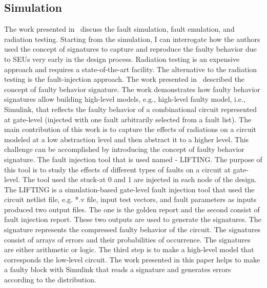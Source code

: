 \subsection{Simulation}

The work presented in~\cite{robache2013methodology} discuss the fault simulation, fault emulation, and radiation testing. Starting from the simulation, I can interrogate how the authors used the concept of signatures to capture and reproduce the faulty behavior due to SEUs very early in the design process.
Radiation testing is an expensive approach and requires a state-of-the-art facility. The alternative to the radiation testing is the fault-injection approach.  The work presented in~\cite{hobeika2014multi} described the concept of faulty behavior signature. The work demonstrates how faulty behavior signatures allow building high-level models, e.g., high-level faulty model, i.e., Simulink, that reflects the faulty behavior of a combinational circuit represented at gate-level  (injected with one fault arbitrarily selected from a fault list). The main contribution of this work is to capture the effects of radiations on a circuit modeled at a low abstraction level and then abstract it to a  higher level. This challenge can be accomplished by introducing the concept of faulty behavior signature.  The fault injection tool that is used named - LIFTING.  The purpose of this tool is to study the effects of different types of faults on a circuit at gate-level. The tool used the stuck-at 0 and 1 are injected in each node of the design. The LIFTING is a simulation-based gate-level fault injection tool that used the circuit netlist file, e.g.  *.v file, input test vectors, and fault parameters as inputs produced two output files. The one is the golden report and the second consist of fault injection report. These two outputs are used to generate the signatures.  The signature represents the compressed faulty behavior of the circuit. The signatures consist of arrays of errors and their probabilities of occurrence. The signatures are either arithmetic or logic.  The third step is to make a high-level model that corresponds the low-level circuit. The work presented in this paper helps to make a faulty block with Simulink that reads a signature and generates errors according to the distribution.

